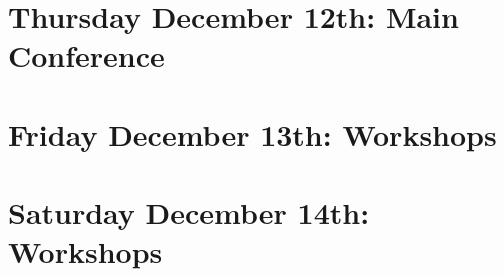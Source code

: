 \documentclass[11pt]{article}
\begin{document}
\newpage
\section{Thursday December 12th: Main Conference}



\newpage
\section{Friday December 13th: Workshops}



\newpage
\section{Saturday December 14th: Workshops}





\newpage


\end{document}
